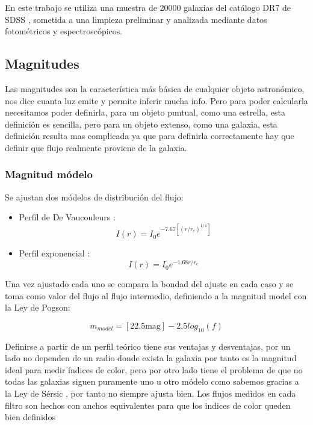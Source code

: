 \documentclass[twocolumn]{article}
\begin{document}
En este trabajo se utiliza una muestra de 20000 galaxias del catálogo DR7 de SDSS \citep{SDSSDR7}, sometida a una limpieza preliminar y analizada mediante datos fotométricos y espectroscópicos.




\subsection{Magnitudes}
Las magnitudes son la característica más básica de cualquier objeto astronómico, nos dice cuanta luz emite y permite inferir mucha info. Pero para poder calcularla necesitamos poder definirla, para un objeto puntual, como una estrella, esta definición es sencilla, pero para un objeto extenso, como una galaxia, esta definición resulta mas complicada ya que para definirla correctamente hay que definir que flujo realmente proviene de la galaxia.

\subsubsection{Magnitud módelo}
Se ajustan dos módelos de distribución del flujo:
\begin{itemize}
	\item Perfil de De Vaucouleurs \citep{1948AnAp...11..247D}:  
	\begin{equation}
        I(r) = I_0 e^{-7.67 [(r/r_e)^{1/4}]}
    \end{equation}
   
	\item Perfil exponencial \citep{1970ApJ...160..811F}:
	\begin{equation}
        I(r) = I_0 e^{-1.68r/r_e}
    \end{equation}
\end{itemize}

Una vez ajustado cada uno se compara la bondad del ajuste en cada caso y se toma como valor del flujo al flujo intermedio, definiendo a la magnitud model con la Ley de Pogson: 

\begin{equation}
m_{model}= [22.5 \text{mag}] - 2.5 log_{10} (f)
\end{equation}

Definirse a partir de un perfil teórico tiene sus ventajas y desventajas, por un lado no dependen de un radio donde exista la galaxia por tanto es la magnitud ideal para medir índices de color, pero por otro lado tiene el problema de que no todas las galaxias siguen puramente uno u otro módelo como sabemos gracias a la Ley de Sérsic \citep{1963BAAA....6...41S}, por tanto no siempre ajusta bien.
Los flujos medidos en cada filtro son hechos con anchos equivalentes para que los indices de color queden bien definidos
\end{document}
